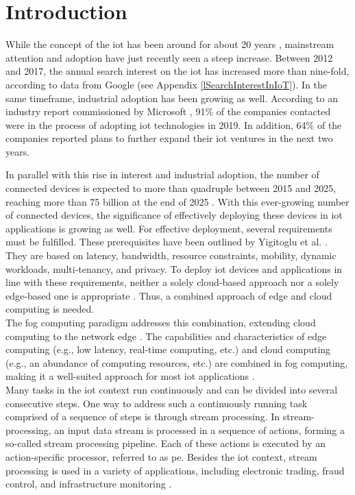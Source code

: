 \section{Introduction}
\label{lIntroduction}
While the concept of the \acrfull{iot} has been around for about 20 years \cite{Hutchison.2010}, mainstream attention and adoption have just recently seen a steep increase. Between 2012 and 2017, the annual search interest on the \gls{iot} has increased more than nine-fold, according to data from Google (see Appendix \ref{lSearchInterestInIoT}). In the same timeframe, industrial adoption has been growing as well. According to an industry report commissioned by Microsoft \cite{Microsoft.2020}, 91\% of the companies contacted were in the process of adopting \gls{iot} technologies in 2019. In addition, 64\% of the companies reported plans to further expand their \gls{iot} ventures in the next two years.\par
In parallel with this rise in interest and industrial adoption, the number of connected devices is expected to more than quadruple between 2015 and 2025, reaching more than 75 billion at the end of 2025 \cite{B.Safaei.2017}. With this ever-growing number of connected devices, the significance of effectively deploying these devices in \gls{iot} applications is growing as well. For effective deployment, several requirements must be fulfilled. These prerequisites have been outlined by Yigitoglu et al. \cite{Yigitoglu.2017}. They are based on latency, bandwidth, resource constraints, mobility, dynamic workloads, multi-tenancy, and privacy. To deploy \gls{iot} devices and applications in line with these requirements, neither a solely cloud-based approach nor a solely edge-based one is appropriate \cite{Yousefpour.2019}. Thus, a combined approach of edge and cloud computing is needed.\\
The fog computing paradigm addresses this combination, extending cloud computing to the network edge \cite{Bonomi.2012}. The capabilities and characteristics of edge computing (e.g., low latency, real-time computing, etc.) and cloud computing (e.g., an abundance of computing resources, etc.) are combined in fog computing, making it a well-suited approach for most \gls{iot} applications \cite{Yousefpour.2019}.\\
Many tasks in the \gls{iot} context run continuously and can be divided into several consecutive steps. One way to address such a continuously running task comprised of a sequence of steps is through stream processing. In stream-processing, an input data stream is processed in a sequence of actions, forming a so-called stream processing pipeline. Each of these actions is executed by an action-specific processor, referred to as \acrfull{pe}. Besides the \gls{iot} context, stream processing is used in a variety of applications, including electronic trading, fraud control, and infrastructure monitoring \cite{Stonebraker.2005}.\\
